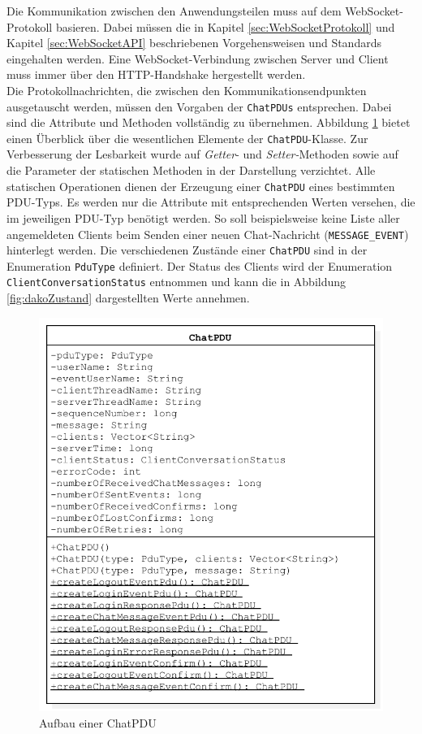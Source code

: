 \documentclass[11pt,a4paper,titlepage]{scrartcl}
\numberwithin{equation}{section}
\begin{document}
\noindent Die Kommunikation zwischen den Anwendungsteilen muss auf dem WebSocket-Protokoll basieren. Dabei müssen die in Kapitel \ref{sec:WebSocketProtokoll} und Kapitel \ref{sec:WebSocketAPI} beschriebenen Vorgehensweisen und Standards eingehalten werden. Eine WebSocket-Verbindung zwischen Server und Client muss immer über den HTTP-Handshake hergestellt werden.\\

\noindent Die Protokollnachrichten, die zwischen den Kommunikationsendpunkten ausgetauscht werden, müssen den Vorgaben der \texttt{ChatPDUs} entsprechen. Dabei sind die Attribute und Methoden vollständig zu übernehmen. Abbildung \ref{fig:chatPDU} bietet einen Überblick über die wesentlichen Elemente der \texttt{ChatPDU}-Klasse. Zur Verbesserung der Lesbarkeit wurde auf \textit{Getter}- und \textit{Setter-}Methoden sowie auf die Parameter der statischen Methoden in der Darstellung verzichtet. Alle statischen Operationen dienen der Erzeugung einer \texttt{ChatPDU} eines bestimmten PDU-Typs. Es werden nur die Attribute mit entsprechenden Werten versehen, die im jeweiligen PDU-Typ benötigt werden. So soll beispielsweise keine Liste aller angemeldeten Clients beim Senden einer neuen Chat-Nachricht (\texttt{MESSAGE\_EVENT}) hinterlegt werden. Die verschiedenen Zustände einer \texttt{ChatPDU} sind in der Enumeration \texttt{PduType} definiert. Der Status des Clients wird der Enumeration \texttt{ClientConversationStatus} entnommen und kann die in Abbildung \ref{fig:dakoZustand} dargestellten Werte annehmen.
\newpage

\begin{figure}[ht] 
	\begin{center}
		\includegraphics[scale=0.7]{img/ChatPDU.pdf}
		\caption{Aufbau einer ChatPDU}
		\label{fig:chatPDU}
	\end{center}
\end{figure}
\end{document}
